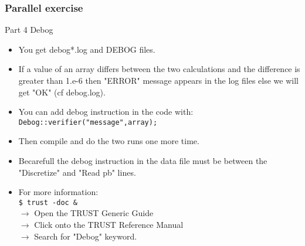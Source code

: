 \documentclass[10pt, hyperref={unicode=true,pdfusetitle, bookmarks=true,bookmarksnumbered=false,bookmarksopen=false, breaklinks=false,pdfborder={0 0 1},backref=true,colorlinks=true,linkcolor=darkblue,pageanchor, urlcolor=darkblue}]{beamer}
\begin{document}
\begin{frame}
\frametitle{Parallel exercise}
\begin{block}{Part 4 Debog}

\begin{itemize}
\item You get debog*.log and DEBOG files.
\item If a value of an array differs between the two calculations and the difference is greater than 1.e-6 then "ERROR" message appears in the log files else we will get "OK" (cf debog.log).\\
\item You can add debog instruction in the code with:\\
\texttt{Debog::verifier("message",array);}
\item Then compile and do the two runs one more time.
\item Becarefull the debog instruction in the data file must be between the "Discretize" and "Read pb" lines.
\item For more information:\\
\texttt{\$ trust -doc \&} \\
$\rightarrow$ Open the TRUST Generic Guide\\
$\rightarrow$ Click onto the TRUST Reference Manual\\
$\rightarrow$ Search for "Debog" keyword.
\end{itemize}

\end{block}
\end{frame}



\end{document}
